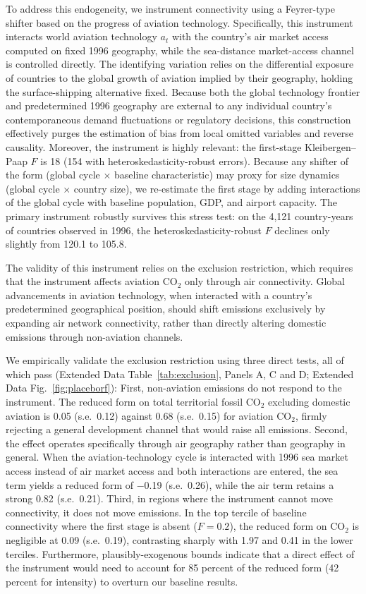 \documentclass[12pt]{extarticle}
\begin{document}
To address this endogeneity, we instrument connectivity using a Feyrer-type shifter based on the progress of aviation technology. Specifically, this instrument interacts world aviation technology $a_t$ with the country's air market access computed on fixed 1996 geography, while the sea-distance market-access channel is controlled directly. The identifying variation relies on the differential exposure of countries to the global growth of aviation implied by their geography, holding the surface-shipping alternative fixed. Because both the global technology frontier and predetermined 1996 geography are external to any individual country's contemporaneous demand fluctuations or regulatory decisions, this construction effectively purges the estimation of bias from local omitted variables and reverse causality. Moreover, the instrument is highly relevant: the first-stage Kleibergen--Paap $F$ is 18 (154 with heteroskedasticity-robust errors). Because any shifter of the form (global cycle $\times$ baseline characteristic) may proxy for size dynamics (global cycle $\times$ country size), we re-estimate the first stage by adding interactions of the global cycle with baseline population, GDP, and airport capacity. The primary instrument robustly survives this stress test: on the 4,121 country-years of countries observed in 1996, the heteroskedasticity-robust $F$ declines only slightly from 120.1 to 105.8.

The validity of this instrument relies on the exclusion restriction, which requires that the instrument affects aviation CO$_2$ only through air connectivity. Global advancements in aviation technology, when interacted with a country's predetermined geographical position, should shift emissions exclusively by expanding air network connectivity, rather than directly altering domestic emissions through non-aviation channels.

We empirically validate the exclusion restriction using three direct tests, all of which pass (Extended Data Table~\ref{tab:exclusion}, Panels A, C and D; Extended Data Fig.~\ref{fig:placeborf}):
First, non-aviation emissions do not respond to the instrument. The reduced form on total territorial fossil CO$_2$ excluding domestic aviation is 0.05 (s.e.\ 0.12) against 0.68 (s.e.\ 0.15) for aviation CO$_2$, firmly rejecting a general development channel that would raise all emissions. 
Second, the effect operates specifically through air geography rather than geography in general. When the aviation-technology cycle is interacted with 1996 sea market access instead of air market access and both interactions are entered, the sea term yields a reduced form of $-$0.19 (s.e.\ 0.26), while the air term retains a strong 0.82 (s.e.\ 0.21). 
Third, in regions where the instrument cannot move connectivity, it does not move emissions. In the top tercile of baseline connectivity where the first stage is absent ($F = 0.2$), the reduced form on CO$_2$ is negligible at 0.09 (s.e.\ 0.19), contrasting sharply with 1.97 and 0.41 in the lower terciles.
Furthermore, plausibly-exogenous bounds indicate that a direct effect of the instrument would need to account for 85 percent of the reduced form (42 percent for intensity) to overturn our baseline results.
\end{document}
